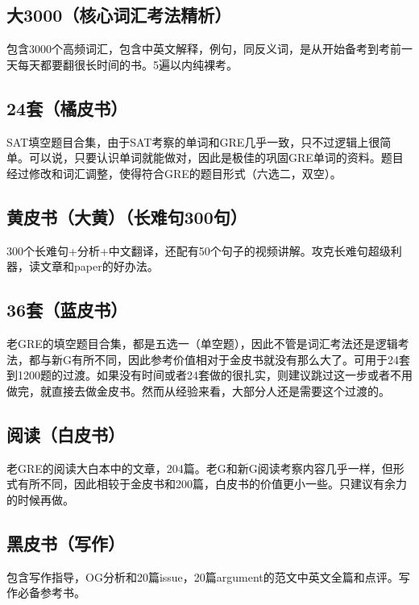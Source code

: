 \documentclass[11pt,a4paper]{article}
\begin{document}
{	\subsection{大3000（核心词汇考法精析）}包含3000个高频词汇，包含中英文解释，例句，同反义词，是从开始备考到考前一天每天都要翻很长时间的书。5遍以内纯裸考。\\
	
	\subsection{24套（橘皮书）}SAT填空题目合集，由于SAT考察的单词和GRE几乎一致，只不过逻辑上很简单。可以说，只要认识单词就能做对，因此是极佳的巩固GRE单词的资料。题目经过修改和词汇调整，使得符合GRE的题目形式（六选二，双空）。
	
	\subsection{黄皮书（大黄）（长难句300句）}300个长难句+分析+中文翻译，还配有50个句子的视频讲解。攻克长难句超级利器，读文章和paper的好办法。
	
	\subsection{36套（蓝皮书）}老GRE的填空题目合集，都是五选一（单空题），因此不管是词汇考法还是逻辑考法，都与新G有所不同，因此参考价值相对于金皮书就没有那么大了。可用于24套到1200题的过渡。如果没有时间或者24套做的很扎实，则建议跳过这一步或者不用做完，就直接去做金皮书。然而从经验来看，大部分人还是需要这个过渡的。
	
	\subsection{阅读（白皮书）}老GRE的阅读大白本中的文章，204篇。老G和新G阅读考察内容几乎一样，但形式有所不同，因此相较于金皮书和200篇，白皮书的价值更小一些。只建议有余力的时候再做。
	
	\subsection{黑皮书（写作）}包含写作指导，OG分析和20篇issue，20篇argument的范文中英文全篇和点评。写作必备参考书。
	
}
\end{document}
